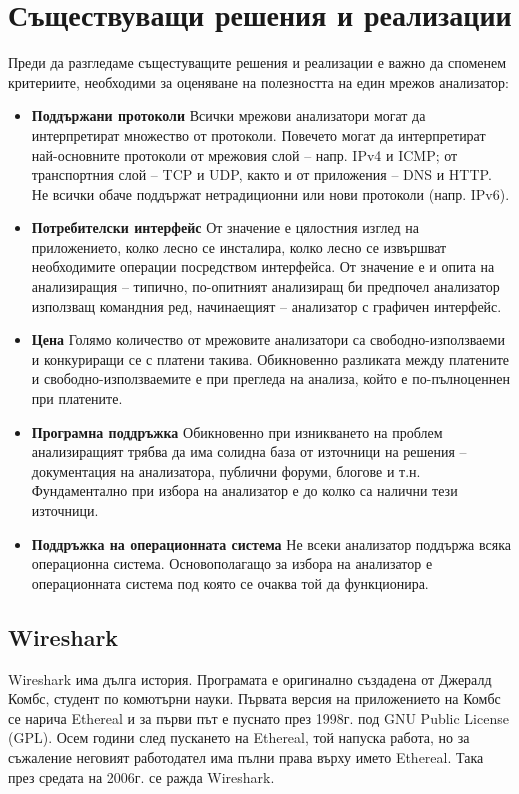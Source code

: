 \documentclass[12pt,a4paper,oneside]{book}
\begin{document}
\section{Съществуващи решения и реализации}

Преди да разгледаме същестуващите решения и реализации е важно да споменем
критериите, необходими за оценяване на полезността на един мрежов анализатор:

\begin{itemize}
  \item \textbf{Поддържани протоколи} Всички мрежови анализатори могат да
    интерпретират множество от протоколи. Повечето могат да интерпретират
    най-основните протоколи от мрежовия слой -- напр. IPv4 и ICMP; от
    транспортния слой -- TCP и UDP, както и от приложения -- DNS и HTTP.
    Не всички обаче поддържат нетрадиционни или нови протоколи (напр. IPv6).
  \item \textbf{Потребителски интерфейс} От значение е цялостния изглед на
    приложението, колко лесно се инсталира, колко лесно се извършват
    необходимите операции посредством интерфейса. От значение е и опита на
    анализиращия -- типично, по-опитният анализиращ би предпочел анализатор
    използващ командния ред, начинаещият -- анализатор с графичен интерфейс.
  \item \textbf{Цена} Голямо количество от мрежовите анализатори са
    свободно-използваеми и конкуриращи се с платени такива. Обикновенно
    разликата между платените и свободно-използваемите е при прегледа на
    анализа, който е по-пълноценнен при платените.
  \item \textbf{Програмна поддръжка} Обикновенно при изникването на проблем
    анализиращият трябва да има солидна база от източници на решения --
    документация на анализатора, публични форуми, блогове и т.н. Фундаментално
    при избора на анализатор е до колко са налични тези източници.
  \item \textbf{Поддръжка на операционната система} Не всеки анализатор поддържа
    всяка операционна система. Основополагащо за избора на анализатор е
    операционната система под която се очаква той да функционира.
\end{itemize}


\subsection{Wireshark}

Wireshark има дълга история. Програмата е оригинално създадена от Джералд Комбс,
студент по комютърни науки. Първата версия на приложението на Комбс се нарича
Ethereal и за първи път е пуснато през 1998г. под GNU Public License (GPL).  Осем
години след пускането на Ethereal, той напуска работа, но за съжаление
неговият работодател има пълни права върху името Ethereal. Така през средата на
2006г. се ражда Wireshark.
\end{document}
